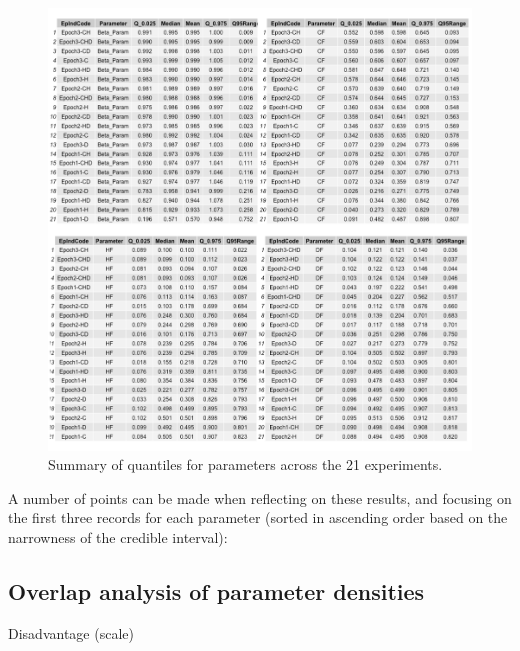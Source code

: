 \documentclass[10pt,letterpaper]{article}
\begin{document}
\begin{figure}
\includegraphics[width=1\linewidth]{diagrams/exp_quants} \caption{Summary of quantiles for parameters across the 21 experiments.}\label{fig:exp-quants}
\end{figure}

A number of points can be made when reflecting on these results, and focusing on the first three records for each parameter (sorted in ascending order based on the narrowness of the credible interval):

\hypertarget{overlap-analysis-of-parameter-densities}{%
\subsection{Overlap analysis of parameter densities}\label{overlap-analysis-of-parameter-densities}}

Disadvantage (scale)
\end{document}
